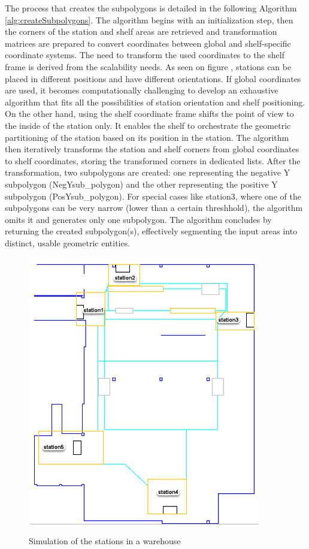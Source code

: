 The process that creates the subpolygons is detailed in the following Algorithm \ref{alg:createSubpolygons}.
The algorithm begins with an initialization step, then the corners of the station and shelf areas are retrieved and 
transformation matrices are prepared to convert coordinates between global and shelf-specific coordinate systems. 
The need to transform the used coordinates to the shelf frame is derived from the scalability needs.
As seen on figure , stations can be placed in different positions and have different orientations.
If global coordinates are used, it becomes computationally challenging to develop an exhaustive algorithm that fits all the 
possibilities of station orientation and shelf positioning. On the other hand, using the shelf coordinate frame shifts 
the point of view to the inside of the station only. It enables the shelf to orchestrate the geometric partitioning 
of the station based on its position in the station.
The algorithm then iteratively transforms the station and shelf corners from global coordinates to shelf coordinates, 
storing the transformed corners in dedicated lists. After the transformation, two subpolygons are created: one 
representing the negative Y subpolygon (NegYsub\_polygon) and the other representing the positive Y subpolygon
(PosYsub\_polygon). For special cases like station3, where one of the subpolygons can be very narrow (lower than a 
certain threshhold), the algorithm omits it and generates only one subpolygon. 
The algorithm concludes by returning the created subpolygon(s), effectively segmenting the 
input areas into distinct, usable geometric entities.


\begin{figure}[H]
    \begin{center}
        \includegraphics[width=4in]{images/Chap2/warehouse.png}\\
        \caption{Simulation of the stations in a warehouse}
        \label{warehouse}
        \end{center}    
\end{figure}



